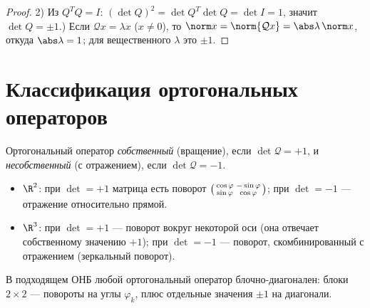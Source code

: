\begin{proof}
2) Из $Q^{T}Q=I$: $(\det Q)^2=\det Q^{T}\det Q=\det I=1$, значит $\det Q=\pm1$.) Если $\mathcal Qx=\lambda x$ ($x\ne0$), то $\norm x=\norm{\mathcal Qx}=\abs\lambda\,\norm x$,
откуда $\abs\lambda=1$; для вещественного $\lambda$ это $\pm1$.
\end{proof}

\section{Классификация ортогональных операторов}

\begin{definition}
Ортогональный оператор \emph{собственный} (вращение), если $\det\mathcal Q=+1$, и
\emph{несобственный} (с отражением), если $\det\mathcal Q=-1$.
\end{definition}

\begin{remark}[геометрия в $\R^2$ и $\R^3$]
\begin{itemize}[leftmargin=*,nosep]
  \item $\R^2$: при $\det=+1$ матрица есть поворот
        $\begin{psmallmatrix}\cos\varphi&-\sin\varphi\\ \sin\varphi&\cos\varphi\end{psmallmatrix}$;
        при $\det=-1$ — отражение относительно прямой.
  \item $\R^3$: при $\det=+1$ — поворот вокруг некоторой оси (она отвечает собственному значению
        $+1$); при $\det=-1$ — поворот, скомбинированный с отражением (зеркальный поворот).
\end{itemize}
В подходящем ОНБ любой ортогональный оператор блочно-диагонален: блоки $2\times2$ — повороты на углы
$\varphi_k$, плюс отдельные значения $\pm1$ на диагонали.
\end{remark}
